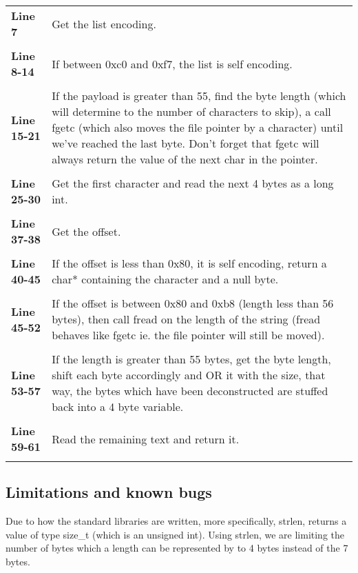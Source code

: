 \documentclass[a4paper, 12pt, titlepage]{article}
\newenvironment{code}{\captionsetup{type=listing}}{}
\newcommand{\sourcecode}[3]{
    \begin{code}
      \inputminted[linenos,numbersep=5pt,gobble=0,frame=lines,framesep=2mm,]{c}{#1}
        \caption{#2}
        \label{lst: #3}
    \end{code}
}
\begin{document}
\begin{onehalfspacing}
   \sourcecode{snippets/task2b/file_functions.c}{Helper functions used to decode from the previously RLP encoded file.}{file_functions}
   \begin{longtable}{l p{10cm}}
     \textbf{Line 7} & Get the list encoding. \\ \\
     \textbf{Line 8-14} & If between 0xc0 and 0xf7, the list is self encoding. \\ \\
     \textbf{Line 15-21} & If the payload is greater than 55, find the byte length (which will determine to the number of characters to skip), a call fgetc (which also moves the file pointer by a character) until we've reached the last byte. Don't forget that fgetc will always return the value of the next char in the pointer. \\ \\
     \textbf{Line 25-30} & Get the first character and read the next 4 bytes as a long int. \\ \\
     \textbf{Line 37-38} & Get the offset. \\ \\
     \textbf{Line 40-45} & If the offset is less than 0x80, it is self encoding, return a char* containing the character and a null byte. \\ \\
     \textbf{Line 45-52} & If the offset is between 0x80 and 0xb8 (length less than 56 bytes), then call fread on the length of the string (fread behaves like fgetc ie. the file pointer will still be moved). \\ \\
     \textbf{Line 53-57} & If the length is greater than 55 bytes, get the byte length, shift each byte accordingly and OR it with the size, that way, the bytes which have been deconstructed are stuffed back into a 4 byte variable. \\ \\
     \textbf{Line 59-61} & Read the remaining text and return it. \\ \\
   \end{longtable}

   \subsection{Limitations and known bugs}
   Due to how the standard libraries are written, more specifically, strlen, returns a value of type size\_t (which is an unsigned int). Using strlen, we are limiting the number of bytes which a length can be represented by to 4 bytes instead of the 7 bytes.


\end{onehalfspacing}
\end{document}
